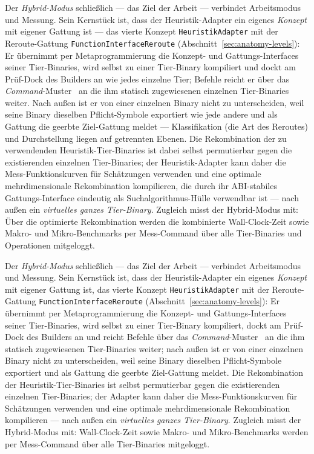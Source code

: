 \begin{nurlang}
Der \emph{Hybrid-Modus} schließlich --- das Ziel der Arbeit --- verbindet Arbeitsmodus und Messung. Sein
Kernstück ist, dass der Heuristik-Adapter ein eigenes \emph{Konzept} mit eigener Gattung ist --- das vierte
Konzept \texttt{HeuristikAdapter} mit der Reroute-Gattung \texttt{FunctionInterfaceReroute}
(Abschnitt~\ref{sec:anatomy-levels}): Er übernimmt per Metaprogrammierung die Konzept- und
Gattungs-Interfaces seiner Tier-Binaries, wird selbst zu einer Tier-Binary kompiliert und dockt am
Prüf-Dock des Builders an wie jedes einzelne Tier; Befehle reicht er über das
\emph{Command}-Muster~\cite{gamma1994patterns} an die ihm statisch zugewiesenen einzelnen Tier-Binaries
weiter. Nach außen ist er von einer einzelnen Binary nicht zu unterscheiden, weil seine Binary dieselben
Pflicht-Symbole exportiert wie jede andere und als Gattung die geerbte Ziel-Gattung meldet --- Klassifikation
(die Art des Reroutes) und Durchstellung liegen auf getrennten Ebenen. Die Rekombination der zu
verwendenden Heuristik-Tier-Binaries ist dabei selbst permutierbar gegen die existierenden einzelnen
Tier-Binaries; der Heuristik-Adapter kann daher die Mess-Funktionskurven für Schätzungen verwenden und
eine optimale mehrdimensionale Rekombination kompilieren, die durch ihr ABI-stabiles Gattungs-Interface
eindeutig als Suchalgorithmus-Hülle verwendbar ist --- nach außen ein \emph{virtuelles ganzes
Tier-Binary}. Zugleich misst der Hybrid-Modus mit: Über die optimierte
Rekombination werden die kombinierte Wall-Clock-Zeit sowie Makro- und Mikro-Benchmarks per Mess-Command
über alle Tier-Binaries und Operationen mitgeloggt.
\end{nurlang}
\begin{nurkurz}
Der \emph{Hybrid-Modus} schließlich --- das Ziel der Arbeit --- verbindet Arbeitsmodus und Messung. Sein
Kernstück ist, dass der Heuristik-Adapter ein eigenes \emph{Konzept} mit eigener Gattung ist, das vierte Konzept
\texttt{HeuristikAdapter} mit der Reroute-Gattung \texttt{FunctionInterfaceReroute}
(Abschnitt~\ref{sec:anatomy-levels}): Er übernimmt per Metaprogrammierung die Konzept- und Gattungs-Interfaces
seiner Tier-Binaries, wird selbst zu einer Tier-Binary kompiliert, dockt am Prüf-Dock des Builders an und
reicht Befehle über das \emph{Command}-Muster~\cite{gamma1994patterns} an die ihm statisch zugewiesenen
Tier-Binaries weiter; nach außen ist er von einer einzelnen Binary nicht zu unterscheiden, weil seine Binary
dieselben Pflicht-Symbole exportiert und als Gattung die geerbte Ziel-Gattung meldet. Die Rekombination der
Heuristik-Tier-Binaries ist selbst permutierbar gegen die existierenden einzelnen Tier-Binaries; der Adapter
kann daher die Mess-Funktionskurven für Schätzungen verwenden und eine optimale mehrdimensionale Rekombination
kompilieren --- nach außen ein \emph{virtuelles ganzes Tier-Binary}. Zugleich misst der Hybrid-Modus mit:
Wall-Clock-Zeit sowie Makro- und Mikro-Benchmarks werden per Mess-Command über alle Tier-Binaries mitgeloggt.
\end{nurkurz}

